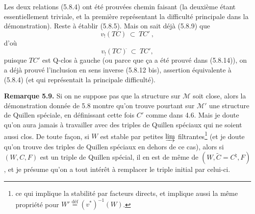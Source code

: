 \documentclass[11pt]{article}
\newcommand{\msp}[1]{\marginpar{\footnotesize [#1]}}
\newcommand{\cl}{^{\tilde{}}}%
\newcommand{\defeq}{\overset{\text{déf}}{=}}
\begin{document}
Les deux relations (5.8.4) ont été prouvées chemin faisant (la deuxième étant essentiellement triviale, et la première représentant la difficulté principale dans la démonstration). Reste à établir (5.8.5). Mais on sait déjà (5.8.9) que
\[
v_!(TC) \ \subset \ TC'\ ,
\]
\msp{page 97}
d'où
\[
v_!(TC)\cl \ \subset \ TC',
\]
puisque $TC'$ est Q-clos à gauche (ou parce que ça a été prouvé dans (5.8.14)), on a déjà prouvé l'inclusion en sens inverse (5.8.12 bis), assertion équivalente à (5.8.4) (et qui représentait la principale difficulté).

\textbf{Remarque 5.9.} Si on ne suppose pas que la structure sur $\mathcal{M}$ soit close, alors la démonstration donnée de 5.8 montre qu'on trouve pourtant sur $\mathcal{M}'$ une structure de Quillen spéciale, en définissant cette fois $C'$ comme dans 4.6. Mais je doute qu'on aura jamais à travailler avec des triples de Quillen spéciaux qui ne soient aussi clos. De toute façon, si $W$ est stable par petites $\varinjlim$ filtrantes\footnote[28]{ce qui implique la stabilité par facteurs directs, et implique aussi la même propriété pour $W' \defeq (v^*)^{-1}(W)$.} (et je doute qu'on trouve des triples de Quillen spéciaux en dehors de ce cas), alors si $(W, C, F)$ est un triple de Quillen spécial, il en est de même de $(W, \tilde{C} = C^\natural, F)$, et je présume qu'on a tout intérêt à remplacer le triple initial par celui-ci. %
\end{document}
